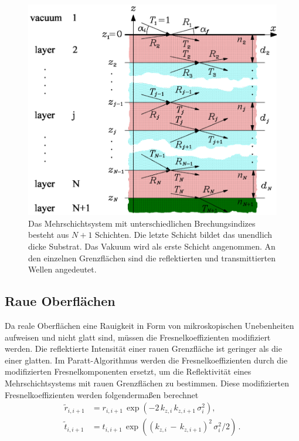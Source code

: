 \begin{figure}
    \centering
    \includegraphics[width=0.7\linewidth]{./figures/Mehrschicht.png}
    \caption{Das Mehrschichtsystem mit unterschiedlichen Brechungsindizes besteht aus $N+1$ Schichten. Die letzte Schicht bildet das unendlich dicke Substrat. Das Vakuum wird als erste Schicht angenommen. An den einzelnen Grenzflächen sind die reflektierten und transmittierten Wellen angedeutet. \cite{V44old}}
    \label{fig:Mehrschicht}
\end{figure}



\subsection{Raue Oberflächen}
Da reale Oberflächen eine Rauigkeit in Form von mikroskopischen Unebenheiten aufweisen und nicht glatt sind, müssen die Fresnelkoeffizienten modifiziert werden. Die reflektierte Intensität einer rauen Grenzfläche ist geringer als die einer glatten. Im Paratt-Algorithmus werden die Fresnelkoeffizienten durch die modifizierten Fresnelkomponenten ersetzt, um die Reflektivität eines Mehrschichtsystems mit rauen Grenzflächen zu bestimmen. Diese modifizierten Fresnelkoeffizienten werden folgendermaßen berechnet
\begin{align*}
    \tilde{r}_{i,i+1} &= r_{i,i+1} \, \exp(-2 \, k_{z,i} \, k_{z,i+1} \, \sigma^2_i), \\
    \tilde{t}_{i,i+1} &= t_{i,i+1} \, \exp((k_{z,i} \, - \, k_{z,i+1})^2 \, \sigma^2_i / 2) \, .
\end{align*}



